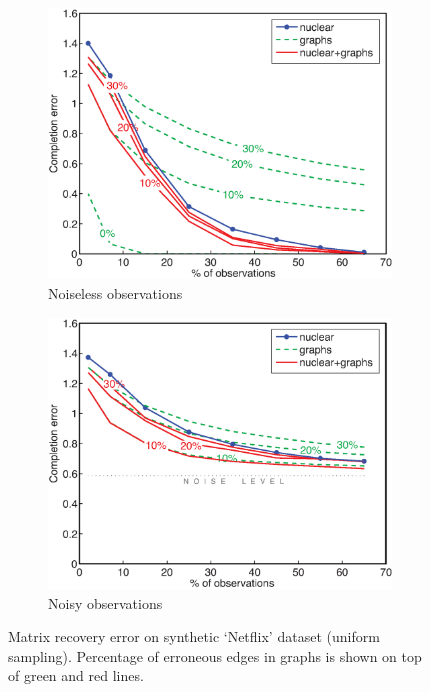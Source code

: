\documentclass{article}
\begin{document}
\begin{figure}
\label{fig:art_uniform_all}
          \begin{subfigure}[b]{.5\linewidth}
            \centering \includegraphics[scale=.38, trim=0 0 0 0, clip=true]{noiseless.eps}
            \caption{Noiseless observations}\label{fig:art_uniform_noiseless}
          \end{subfigure}
          \begin{subfigure}[b]{.5\linewidth}
            \centering\includegraphics[scale=.38, trim=0 0 0 0, clip=true]{noisy.eps}
            \caption{Noisy observations}\label{fig:art_uniform_noisy}
          \end{subfigure}
        \caption{Matrix recovery error on synthetic `Netflix' dataset (uniform sampling). Percentage of erroneous edges in graphs is shown on top of green and red lines. }
	\vspace{-0.45cm}
\end{figure}
\end{document}
